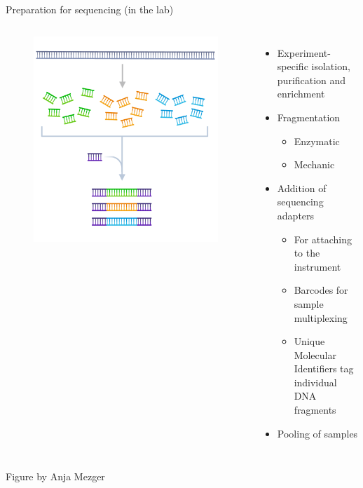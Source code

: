 \documentclass[10pt]{beamer}
\newcommand{\creditdarkleft}[1]{{\vspace{\fill} \par \raggedright \scriptsize \mdseries \color{scMGray} #1 \par}}
\begin{document}
\begin{frame}[standout]{Preparation for sequencing (in the lab)}
	\begin{columns}[T,onlytextwidth]
		\hspace*{-0.7cm} 
		\begin{figure}
			\includegraphics[width=\textwidth]{figures/library-prep.png}
		\end{figure}
			\normalsize \normalfont
			\begin{itemize}
				\item Experiment-specific isolation, purification and enrichment
				\item Fragmentation
				\begin{itemize}
					\item Enzymatic
					\item Mechanic
				\end{itemize}
				\item Addition of sequencing adapters 
				\begin{itemize}
					\item For attaching to the instrument
					\item Barcodes for sample multiplexing
					\item Unique Molecular Identifiers tag individual DNA fragments
				\end{itemize}
			   \item Pooling of samples
			\end{itemize}
	\end{columns}
\creditdarkleft{Figure by Anja Mezger}
\end{frame}
\end{document}
